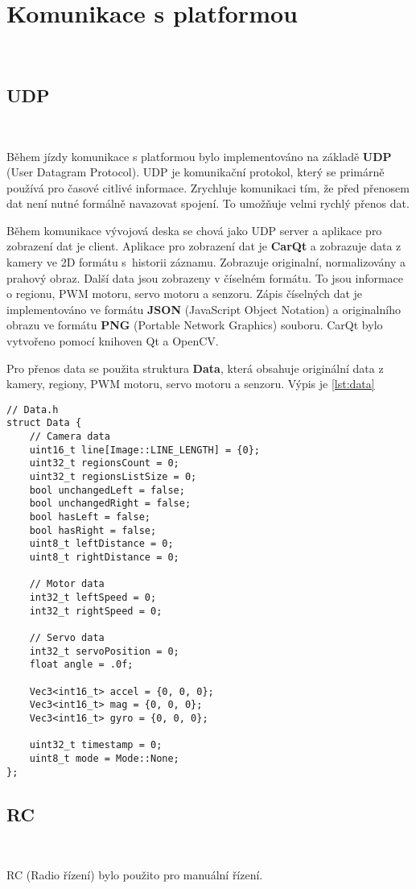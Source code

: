 \chapter{Komunikace s platformou}
\label{sec:PlatformCommunication}
\vspace{-20pt}
\

\section{UDP}\

Během jízdy komunikace s platformou bylo implementováno na základě \textbf{UDP}
(User Datagram Protocol).  UDP je komunikační protokol,
který se primárně používá pro časové citlivé informace.
Zrychluje komunikaci tím, že před přenosem dat není nutné formálně navazovat spojení.
To umožňuje velmi rychlý přenos dat\cite{UDP}.

Během komunikace vývojová deska se chová jako UDP server a aplikace pro zobrazení dat
je client. Aplikace pro zobrazení dat je \textbf{CarQt} a zobrazuje data z kamery
ve 2D formátu  s~historii záznamu. Zobrazuje originalní,
normalizovány a prahový obraz. Další data
jsou zobrazeny v číselném formátu. To jsou informace o regionu, PWM motoru, servo motoru
a senzoru. Zápis číselných dat je implementováno ve formátu \textbf{JSON}
(JavaScript Object Notation) a originalního obrazu ve formátu \textbf{PNG} (Portable Network Graphics) souboru. CarQt bylo vytvořeno pomocí knihoven Qt a OpenCV.

Pro přenos data se použita struktura \textbf{Data}, která obsahuje originální data z kamery, regiony, PWM motoru, servo motoru a senzoru. Výpis je \ref{lst:data}
\begin{lstlisting}[caption=structura Data, label=lst:data]
// Data.h
struct Data {
    // Camera data
    uint16_t line[Image::LINE_LENGTH] = {0};
    uint32_t regionsCount = 0;
    uint32_t regionsListSize = 0;
    bool unchangedLeft = false;
    bool unchangedRight = false;
    bool hasLeft = false;
    bool hasRight = false;
    uint8_t leftDistance = 0;
    uint8_t rightDistance = 0;

    // Motor data
    int32_t leftSpeed = 0;
    int32_t rightSpeed = 0;

    // Servo data
    int32_t servoPosition = 0;
    float angle = .0f;

    Vec3<int16_t> accel = {0, 0, 0};
    Vec3<int16_t> mag = {0, 0, 0};
    Vec3<int16_t> gyro = {0, 0, 0};

    uint32_t timestamp = 0;
    uint8_t mode = Mode::None;
};
\end{lstlisting}


\section{RC}\

RC (Radio řízení) bylo použito pro manuální řízení.
\endinput
